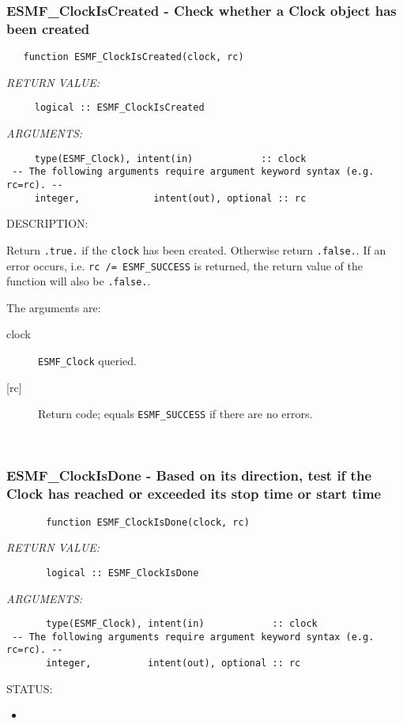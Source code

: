 \subsubsection [ESMF\_ClockIsCreated] {ESMF\_ClockIsCreated - Check whether a Clock object has been created}


 
\begin{verbatim}   function ESMF_ClockIsCreated(clock, rc)\end{verbatim}{\em RETURN VALUE:}
\begin{verbatim}     logical :: ESMF_ClockIsCreated\end{verbatim}{\em ARGUMENTS:}
\begin{verbatim}     type(ESMF_Clock), intent(in)            :: clock
 -- The following arguments require argument keyword syntax (e.g. rc=rc). --
     integer,             intent(out), optional :: rc
 \end{verbatim}
{\sf DESCRIPTION:\\ }


     Return {\tt .true.} if the {\tt clock} has been created. Otherwise return
     {\tt .false.}. If an error occurs, i.e. {\tt rc /= ESMF\_SUCCESS} is
     returned, the return value of the function will also be {\tt .false.}.
  
   The arguments are:
     \begin{description}
     \item[clock]
       {\tt ESMF\_Clock} queried.
     \item[{[rc]}]
       Return code; equals {\tt ESMF\_SUCCESS} if there are no errors.
     \end{description}
   
 
\mbox{}\hrulefill\ 
 
\subsubsection [ESMF\_ClockIsDone] {ESMF\_ClockIsDone - Based on its direction, test if the Clock has reached or exceeded its stop time or start time}


 
\begin{verbatim}       function ESMF_ClockIsDone(clock, rc)\end{verbatim}{\em RETURN VALUE:}
\begin{verbatim}       logical :: ESMF_ClockIsDone
 \end{verbatim}{\em ARGUMENTS:}
\begin{verbatim}       type(ESMF_Clock), intent(in)            :: clock
 -- The following arguments require argument keyword syntax (e.g. rc=rc). --
       integer,          intent(out), optional :: rc
 \end{verbatim}
{\sf STATUS:}
   \begin{itemize}
   \item{}
   \end{itemize}
  
